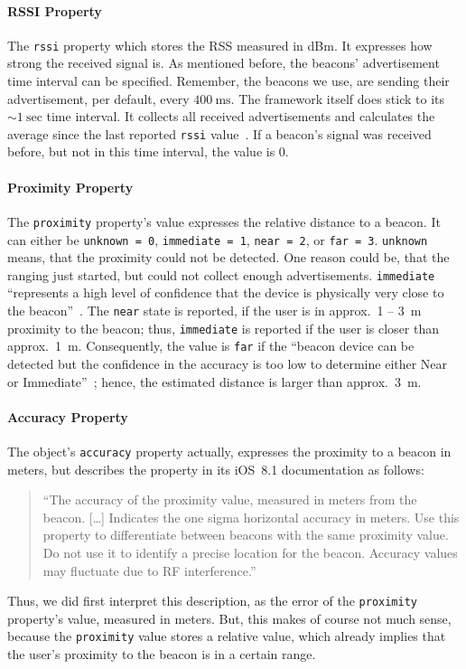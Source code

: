 \paragraph{\acs{RSSI} Property} The \texttt{rssi} property which stores the \acl{RSS} measured in dBm. It expresses how strong the received signal is. As mentioned before, the beacons' advertisement time interval can be specified. Remember, the beacons we use, are sending their advertisement, per default, every $400~\text{ms}$. The framework itself does stick to its $\sim 1~\text{sec}$ time interval. It collects all received advertisements and calculates the  average since the last reported \texttt{rssi} value~\citep{video}. If a beacon's signal was received before, but not in this time interval, the value is 0. %

\paragraph{Proximity Property} The \texttt{proximity} property's value expresses the relative distance to a beacon. It can either be \texttt{unknown = 0}, \texttt{immediate = 1}, \texttt{near = 2}, or \texttt{far = 3}. \texttt{unknown} means, that the proximity could not be detected. One reason could be, that the ranging just started, but could not collect enough advertisements. \texttt{immediate} ``represents a high level of confidence that the device is physically very close to the beacon''~\citep{apple:getting_started}. The \texttt{near} state is reported, if the user is in approx.\ 1 -- 3~m proximity to the beacon; thus, \texttt{immediate} is reported if the user is closer than approx.\ 1~m. Consequently, the value is \texttt{far} if the ``beacon device can be detected but the confidence in the accuracy is too low to determine either Near or Immediate''~\citep{apple:getting_started}; hence, the estimated distance is larger than approx.\ 3~m.

\paragraph{Accuracy Property} The object's \texttt{accuracy} property actually, expresses the proximity to a beacon in meters, but \citet{apple:ios_doc_cl} describes the property in its iOS~8.1 documentation as follows:
\begin{quote}
  ``The accuracy of the proximity value, measured in meters from the beacon.
  [\dots]
  Indicates the one sigma horizontal accuracy in meters. Use this property to differentiate between beacons with the same proximity value. Do not use it to identify a precise location for the beacon. Accuracy values may fluctuate due to RF interference.''\citep{apple:ios_doc_cl}
\end{quote}
Thus, we did first interpret this description, as the error of the \texttt{proximity} property's value, measured in meters. But, this makes of course not much sense, because the \texttt{proximity} value stores a relative value, which already implies that the user's proximity to the beacon is in a certain range.\citep{videos} %

